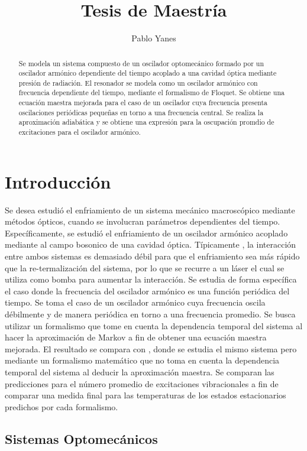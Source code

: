 \documentclass[a4paper,10pt]{report}
\title{Tesis de Maestría}
\author{Pablo Yanes}
\begin{document}
\begin{abstract}
Se modela un sistema compuesto de un oscilador optomecánico formado por un oscilador armónico dependiente del tiempo acoplado a una cavidad óptica mediante presión de radiación. El resonador se modela como un oscilador armónico con frecuencia dependiente del tiempo, mediante el formalismo de Floquet. Se obtiene una ecuación maestra mejorada para el caso de un oscilador cuya frecuencia presenta oscilaciones periódicas pequeñas en torno a una frecuencia central. Se realiza la aproximación adiabática y se obtiene una expresión para la oscupación promdio de excitaciones para el oscilador armónico.
\end{abstract}

\tableofcontents

\chapter{Introducción}

Se desea estudió el enfriamiento de un sistema mecánico macroscópico mediante métodos ópticos, cuando se involucran parámetros dependientes del tiempo. Específicamente, se estudió el enfriamiento de un oscilador armónico acoplado mediante al campo bosonico de una cavidad óptica. Típicamente \cite{BarberisLC}, la interacción entre ambos sistemas es demasiado débil para que el enfriamiento sea más rápido que la re-termalización del sistema, por lo que se recurre a un láser el cual se utiliza como bomba para aumentar la interacción. Se estudia de forma específica el caso donde la frecuencia del oscilador armónico es una función periódica del tiempo. Se toma el caso de un oscilador armónico cuya frecuencia oscila débilmente y de manera periódica en torno a una frecuencia promedio. Se busca utilizar un formalismo que tome en cuenta la dependencia temporal del sistema al hacer la aproximación de Markov a fin de obtener una ecuación maestra mejorada. El resultado se compara con \cite{BarberisLC}, donde se estudia el mismo sistema pero mediante un formalismo matemático que no toma en cuenta la dependencia temporal del sistema al deducir la aproximación maestra. Se comparan las predicciones para el número promedio de excitaciones vibracionales a fin de comparar una medida final para las temperaturas de los estados estacionarios predichos por cada formalismo.

\section{Sistemas Optomecánicos}
\end{document}

